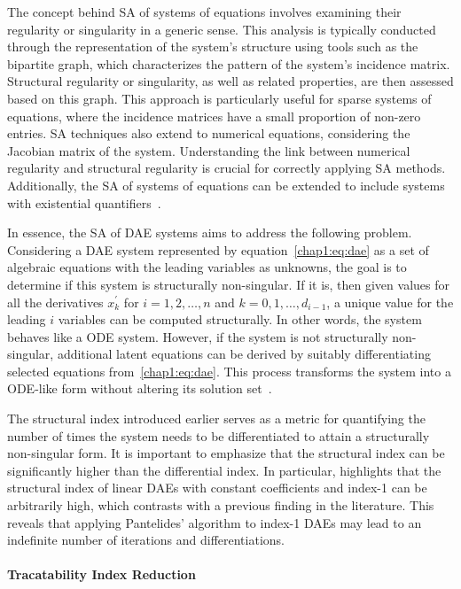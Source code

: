The concept behind \ac{SA} of systems of equations involves examining their regularity or singularity in a generic sense. This analysis is typically conducted through the representation of the system's structure using tools such as the bipartite graph, which characterizes the pattern of the system's incidence matrix. Structural regularity or singularity, as well as related properties, are then assessed based on this graph. This approach is particularly useful for sparse systems of equations, where the incidence matrices have a small proportion of non-zero entries. \ac{SA} techniques also extend to numerical equations, considering the Jacobian matrix of the system. Understanding the link between numerical regularity and structural regularity is crucial for correctly applying \ac{SA} methods. Additionally, the \ac{SA} of systems of equations can be extended to include systems with existential quantifiers~\cite{benveniste2021structural}.

In essence, the \ac{SA} of \ac{DAE} systems aims to address the following problem. Considering a \ac{DAE} system represented by equation~\eqref{chap1:eq:dae} as a set of algebraic equations with the leading variables as unknowns, the goal is to determine if this system is structurally non-singular. If it is, then given values for all the derivatives $x_k^{\prime}$ for $i = 1, 2, \dots, n$ and $k = 0, 1, \dots, d_{i-1}$, a unique value for the leading $i$ variables can be computed structurally. In other words, the system behaves like a \ac{ODE} system. However, if the system is not structurally non-singular, additional latent equations can be derived by suitably differentiating selected equations from~\eqref{chap1:eq:dae}. This process transforms the system into a \ac{ODE}-like form without altering its solution set~\cite{benveniste2021structural}.

The structural index introduced earlier serves as a metric for quantifying the number of times the system needs to be differentiated to attain a structurally non-singular form. It is important to emphasize that the structural index can be significantly higher than the differential index. In particular, \citet{reissig2000differential} highlights that the structural index of linear \acp{DAE} with constant coefficients and index-1 can be arbitrarily high, which contrasts with a previous finding in the literature. This reveals that applying Pantelides' algorithm to index-1 \acp{DAE} may lead to an indefinite number of iterations and differentiations.

\paragraph{Tracatability Index Reduction}

